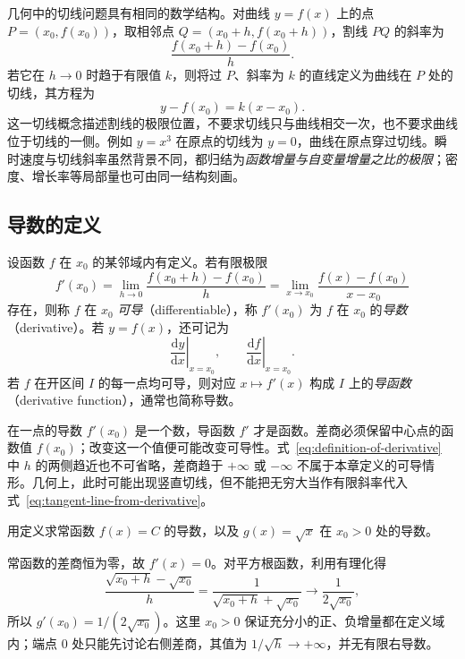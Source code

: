 \documentclass[UTF8,12pt,a4paper,fontset=fandol]{ctexbook}
\begin{document}
几何中的切线问题具有相同的数学结构。对曲线 $y=f(x)$ 上的点 $P=(x_0,f(x_0))$，取相邻点 $Q=(x_0+h,f(x_0+h))$，割线 $PQ$ 的斜率为
\[
    \frac{f(x_0+h)-f(x_0)}h.
\]
若它在 $h\to0$ 时趋于有限值 $k$，则将过 $P$、斜率为 $k$ 的直线定义为曲线在 $P$ 处的切线，其方程为
\begin{equation}
\label{eq:tangent-line-from-derivative}
    y-f(x_0)=k(x-x_0).
\end{equation}
这一切线概念描述割线的极限位置，不要求切线只与曲线相交一次，也不要求曲线位于切线的一侧。例如 $y=x^3$ 在原点的切线为 $y=0$，曲线在原点穿过切线。瞬时速度与切线斜率虽然背景不同，都归结为\emph{函数增量与自变量增量之比的极限}；密度、增长率等局部量也可由同一结构刻画。

\subsection{导数的定义}
\label{subsec:definition-of-derivatives}

\begin{definition}
\label{def:derivative-at-a-point}
设函数 $f$ 在 $x_0$ 的某邻域内有定义。若有限极限
\begin{equation}
\label{eq:definition-of-derivative}
    f'(x_0)=\lim_{h\to0}\frac{f(x_0+h)-f(x_0)}h
    =\lim_{x\to x_0}\frac{f(x)-f(x_0)}{x-x_0}
\end{equation}
存在，则称 $f$ 在 $x_0$ \emph{可导}（differentiable），称 $f'(x_0)$ 为 $f$ 在 $x_0$ 的\emph{导数}（derivative）。若 $y=f(x)$，还可记为
\[
    \left.\frac{\mathrm dy}{\mathrm dx}\right|_{x=x_0},\qquad
    \left.\frac{\mathrm df}{\mathrm dx}\right|_{x=x_0}.
\]
若 $f$ 在开区间 $I$ 的每一点均可导，则对应 $x\mapsto f'(x)$ 构成 $I$ 上的\emph{导函数}（derivative function），通常也简称导数。
\end{definition}

在一点的导数 $f'(x_0)$ 是一个数，导函数 $f'$ 才是函数。差商必须保留中心点的函数值 $f(x_0)$；改变这一个值便可能改变可导性。式~\eqref{eq:definition-of-derivative} 中 $h$ 的两侧趋近也不可省略，差商趋于 $+\infty$ 或 $-\infty$ 不属于本章定义的可导情形。几何上，此时可能出现竖直切线，但不能把无穷大当作有限斜率代入式~\eqref{eq:tangent-line-from-derivative}。

\begin{example}
\label{ex:derivatives-of-constant-and-square-root}
用定义求常函数 $f(x)=C$ 的导数，以及 $g(x)=\sqrt{x}$ 在 $x_0>0$ 处的导数。
\end{example}
\begin{solve}
常函数的差商恒为零，故 $f'(x)=0$。对平方根函数，利用有理化得
\[
    \frac{\sqrt{x_0+h}-\sqrt{x_0}}h
    =\frac1{\sqrt{x_0+h}+\sqrt{x_0}}
    \longrightarrow\frac1{2\sqrt{x_0}},
\]
所以 $g'(x_0)=1/(2\sqrt{x_0})$。这里 $x_0>0$ 保证充分小的正、负增量都在定义域内；端点 $0$ 处只能先讨论右侧差商，其值为 $1/\sqrt{h}\to+\infty$，并无有限右导数。
\end{solve}
\end{document}
